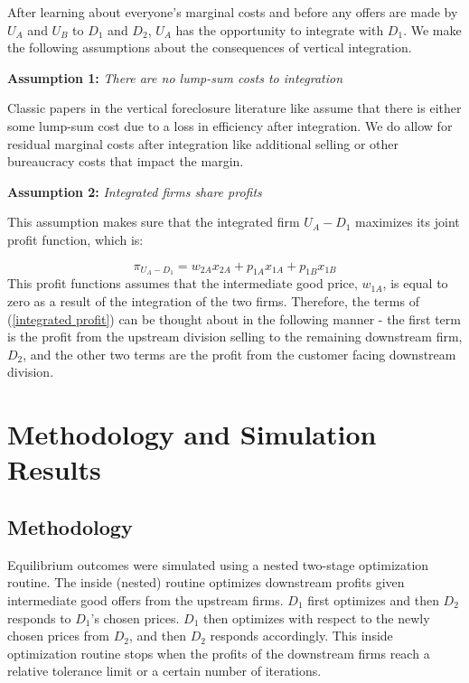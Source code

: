 \documentclass[12pt]{article}%
\begin{document}
After learning about everyone's marginal costs and before any offers are made by $U_A$ and $U_B$ to $D_1$ and $D_2$, $U_A$ has the opportunity to integrate with $D_1$. We make the following assumptions about the consequences of vertical integration.

\noindent\textbf{Assumption 1:} \textit{There are no lump-sum costs to integration}

Classic papers in the vertical foreclosure literature like \cite{hart1990vertical} assume that there is either some lump-sum cost due to a loss in efficiency after integration. We do allow for residual marginal costs after integration like additional selling or other bureaucracy costs that impact the margin. 

\noindent\textbf{Assumption 2:} \textit{Integrated firms share profits}

This assumption makes sure that the integrated firm $U_A-D_1$ maximizes its joint profit function, which is: 

\begin{equation} \label{integrated profit}
    \pi_{U_A-D_1} = w_{2A}x_{2A} + p_{1A}x_{1A} + p_{1B}x_{1B}
\end{equation}
This profit functions assumes that the intermediate good price, $w_{1A}$, is equal to zero as a result of the integration of the two firms. Therefore, the terms of (\ref{integrated profit}) can be thought about in the following manner - the first term is the profit from the upstream division selling to the remaining downstream firm, $D_2$, and the other two terms are the profit from the customer facing downstream division. 


\section{Methodology and Simulation Results}
\label{simulation}

\subsection{Methodology}
Equilibrium outcomes were simulated using a nested two-stage optimization routine. The inside (nested) routine optimizes downstream profits given intermediate good offers from the upstream firms. $D_1$ first optimizes and then $D_2$ responds to $D_1$'s chosen prices. $D_1$ then optimizes with respect to the newly chosen prices from $D_2$, and then $D_2$ responds accordingly. This inside optimization routine stops when the profits of the downstream firms reach a relative tolerance limit or a certain number of iterations.
\end{document}
